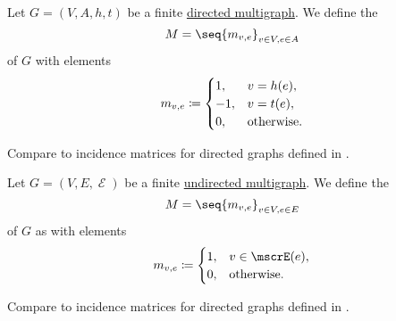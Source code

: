 \begin{definition}\label{def:directed_incidence_matrix}
  Let \( G = (V, A, h, t) \) be a finite \hyperref[def:directed_multigraph]{directed multigraph}. We define the 
  \begin{equation*}
    M = \seq{ m_{v,e} }_{v \in V, e \in A}
  \end{equation*}
  of \( G \) with elements
  \begin{equation*}
    m_{v,e} \coloneqq \begin{cases}
      1,  &v = h(e), \\
      -1, &v = t(e), \\
      0,  &\T{otherwise.}
    \end{cases}
  \end{equation*}
\end{definition}
\begin{comments}
  \item Compare to incidence matrices for directed graphs defined in .
\end{comments}

\begin{definition}\label{def:undirected_incidence_matrix}
  Let \( G = (V, E, \mscrE) \) be a finite \hyperref[def:undirected_multigraph]{undirected multigraph}. We define the 
  \begin{equation*}
    M = \seq{ m_{v,e} }_{v \in V, e \in E}
  \end{equation*}
  of \( G \) as with elements
  \begin{equation*}
    m_{v,e} \coloneqq \begin{cases}
      1,  &v \in \mscrE(e), \\
      0,  &\T{otherwise.}
    \end{cases}
  \end{equation*}
\end{definition}
\begin{comments}
  \item Compare to incidence matrices for directed graphs defined in .
\end{comments}

